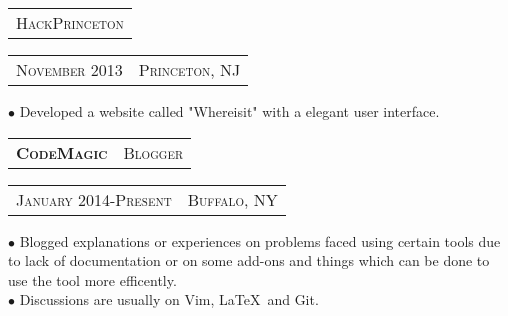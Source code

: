 \documentclass[10pt,a4paper,oneside]{article}
\begin{document}
    \vspace{-12pt}
    \begin{tabular}{c}
        {\small H\textsc{ack}P\textsc{rinceton}}
    \end{tabular}
    \hspace{4.7in}
    \textcolor{light-gray}{
        \begin{tabular}{c|c}
            {\small N\textsc{ovember 2013}}
            &{\small P\textsc{rinceton}, NJ}
        \end{tabular}
    }
    \vspace{-12pt}
    \begin{adjustwidth}{7pt}{0pt}
            {\footnotesize $\bullet$ Developed a website called "Whereisit" with a elegant user interface.}\\
    \end{adjustwidth}
    \vspace{-8pt}
    \begin{tabular}{c|c}
        \textbf{\normalsize C\textsc{ode}M\textsc{agic}}
        &\textmd{\normalsize B\textsc{logger}}
    \end{tabular}
    \hspace{3.83in}
    \textcolor{light-gray}{
        \begin{tabular}{c|c}
            {\small J\textsc{anuary 2014}-P\textsc{resent}}
            &{\small B\textsc{uffalo}, NY}
        \end{tabular}
    } 
    \vspace{-4mm}
    \begin{adjustwidth}{7pt}{0pt}
  {\footnotesize $\bullet$ Blogged explanations or experiences on problems faced using certain tools due to lack
            of documentation or on some add-ons and things which can be done to use the tool more efficently.}\\
            {\footnotesize $\bullet$ Discussions are usually on Vim, \LaTeX \  and Git. }
    \end{adjustwidth}
    \vspace{10pt}
    \begin{comment}
        \begin{tabular}{c}
        \textbf{\normalsize A\textsc{ffiliations}}\\
        \end{tabular}
        \begin{adjustwidth}{7pt}{0pt}
            {\footnotesize \textbf{International Society of Technical Education(09-12)} -Participated in several events and
            organised a few events.}\\
            {\footnotesize \textbf{Computer Society of India(09-12)} -Member since 2009,organised few workshops and
        tutorial sessions.}
            \vspace{0pt}\\
        \end{adjustwidth} 
    \end{comment}
\end{document}
